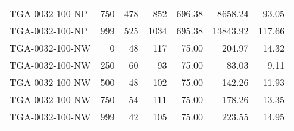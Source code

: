 \begin{table}[htbp]
{\begin{tabular}{lrrrrrr}
    TGA-0032-100-NP & 750    & 478    & 852    & 696.38 & 8658.24 & 93.05 \\
    TGA-0032-100-NP & 999    & 525    & 1034   & 695.38 & 13843.92 & 117.66 \\ \hline
    TGA-0032-100-NW & 0      & 48     & 117    & 75.00  & 204.97 & 14.32 \\
    TGA-0032-100-NW & 250    & 60     & 93     & 75.00  & 83.03  & 9.11 \\
    TGA-0032-100-NW & 500    & 48     & 102    & 75.00  & 142.26 & 11.93 \\
    TGA-0032-100-NW & 750    & 54     & 111    & 75.00  & 178.26 & 13.35 \\
    TGA-0032-100-NW & 999    & 42     & 105    & 75.00  & 223.55 & 14.95 \\
    \bottomrule
    \end{tabular}}
  \label{tab:app-tga-0032-007-stats}%
\end{table}%
